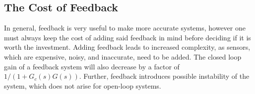 \subsection{The Cost of Feedback}
In general, feedback is very useful to make more accurate systems, however one must always keep the cost of adding said feedback in mind before deciding if it is worth the investment.
Adding feedback leads to increased complexity, as sensors, which are expensive, noisy, and inaccurate, need to be added.
The closed loop gain of a feedback system will also decrease by a factor of $1 / (1 + G_c(s) G(s))$.
Further, feedback introduces possible instability of the system, which does not arise for open-loop systems.
